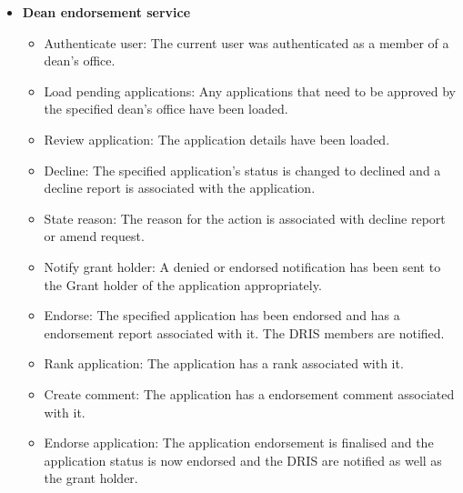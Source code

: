 \documentclass[12pt]{article}
\begin{document}
\begin{itemize}
	\item \textbf{Dean endorsement service}
		\begin{itemize}
			\item Authenticate user: The current user was authenticated as a member of a dean's office.
			\item Load pending applications: Any applications that need to be approved by the specified dean's office have been loaded.
			\item Review application: The application details have been loaded.
			\item Decline: The specified application's status is changed to declined and a decline report is associated with the application.			
			\item State reason: The reason for the action is associated with decline report or amend request. 
			\item Notify grant holder: A denied or endorsed notification has been sent to the Grant holder of the application appropriately.
			\item Endorse: The specified application has been endorsed and has a endorsement report associated with it. The DRIS members are notified.
			\item Rank application: The application has a rank associated with it.	
			\item Create comment: The application has a endorsement comment associated with it.			
			\item Endorse application: The application endorsement is finalised and the application status is now endorsed and the DRIS are notified as well as the grant holder.									
		\end{itemize}
	

\end{itemize}
\end{document}
